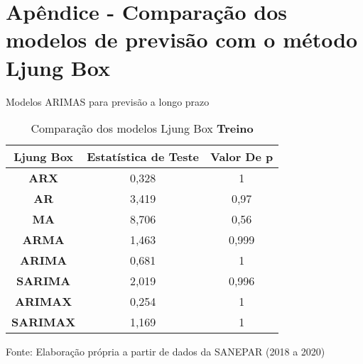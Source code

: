
\section{Ap\^endice - Compara\c c\~ao dos modelos de previs\~ao com o m\'etodo Ljung Box}\label{sec:comtb18}



Modelos ARIMAS para previsão a longo prazo

	\begin{table}[H]
		\centering
		\caption{Comparação dos modelos Ljung Box \textbf{Treino} }\label{tb:lbtrn}
	\begin{tabular}{@{}ccc@{}}
		\toprule
		\textbf{Ljung Box} & \textbf{Estatística de Teste} & \textbf{Valor De p} \\ \midrule
		\textbf{ARX}       & 0,328                         & 1                   \\
		\textbf{AR}        & 3,419                         & 0,97                \\
		\textbf{MA}        & 8,706                         & 0,56                \\
		\textbf{ARMA}      & 1,463                         & 0,999               \\
		\textbf{ARIMA}     & 0,681                         & 1                   \\
		\textbf{SARIMA}    & 2,019                         & 0,996               \\
		\textbf{ARIMAX}    & 0,254                         & 1                   \\
		\textbf{SARIMAX}   & 1,169                         & 1                   \\ \bottomrule
	\end{tabular}

Fonte: Elaboração própria a partir de dados da SANEPAR (2018 a 2020)
	\end{table}

